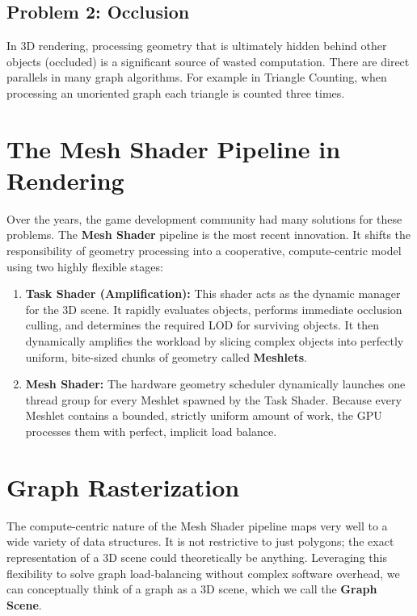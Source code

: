 \documentclass[11pt, a4paper]{article}
\begin{document}
\subsection{Problem 2: Occlusion}
In 3D rendering, processing geometry that is ultimately hidden behind other objects (occluded) is a significant source of wasted computation. There are direct parallels in many graph algorithms. For example in Triangle Counting, when processing an unoriented graph each triangle is counted three times.

\section{The Mesh Shader Pipeline in Rendering}

Over the years, the game development community had many solutions for these problems. The \textbf{Mesh Shader} pipeline is the most recent innovation. It shifts the responsibility of geometry processing into a cooperative, compute-centric model using two highly flexible stages:

\begin{enumerate}
    \item \textbf{Task Shader (Amplification):} This shader acts as the dynamic manager for the 3D scene. It rapidly evaluates objects, performs immediate occlusion culling, and determines the required LOD for surviving objects. It then dynamically amplifies the workload by slicing complex objects into perfectly uniform, bite-sized chunks of geometry called \textbf{Meshlets}.
    \item \textbf{Mesh Shader:} The hardware geometry scheduler dynamically launches one thread group for every Meshlet spawned by the Task Shader. Because every Meshlet contains a bounded, strictly uniform amount of work, the GPU processes them with perfect, implicit load balance.
\end{enumerate}

\section{Graph Rasterization}

The compute-centric nature of the Mesh Shader pipeline maps very well to a wide variety of data structures. It is not restrictive to just polygons; the exact representation of a 3D scene could theoretically be anything. Leveraging this flexibility to solve graph load-balancing without complex software overhead, we can conceptually think of a graph as a 3D scene, which we call the \textbf{Graph Scene}.
\end{document}
